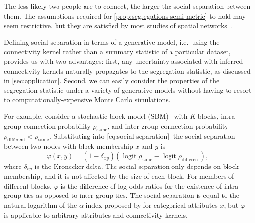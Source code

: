 \documentclass{scrartcl}
\DeclareMathOperator{\logit}{logit}
\begin{document}
\begin{refsection}
The less likely two people are to connect, the larger the social separation between them. The assumptions required for \cref{prop:segregations-semi-metric} to hold may seem restrictive, but they are satisfied by most studies of spatial networks~\cite{Barnett2007,Lambiotte2008,Butts2012,Expert2011}.

Defining social separation in terms of a generative model, i.e.\ using the connectivity kernel rather than a summary statistic of a particular dataset, provides us with two advantages: first, any uncertainty associated with inferred connectivity kernels naturally propagates to the segregation statistic, as discussed in \cref{sec:application}. Second, we can easily consider the properties of the segregation statistic under a variety of generative models without having to resort to computationally-expensive Monte Carlo simulations.

For example, consider a stochastic block model (SBM)~\cite{Snijders2011} with $K$ blocks, intra-group connection probability $\rho_\mathrm{same}$, and inter-group connection probability $\rho_\mathrm{different}<\rho_\mathrm{same}$. Substituting into \cref{eq:social-separation}, the social separation between two nodes with block membership $x$ and $y$ is
\begin{equation}
    \varphi(x, y) = \left(1-\delta_{xy}\right)\left(\logit\rho_\mathrm{same}-\logit\rho_\mathrm{different}\right),\label{eq:social-separation-sbm}
\end{equation}
where $\delta_{xy}$ is the Kronecker delta. The social separation only depends on block membership, and it is not affected by the size of each block. For members of different blocks, $\varphi$ is the difference of log odds ratios for the existence of intra-group ties as opposed to inter-group ties. The social separation is equal to the natural logarithm of the $\alpha$-index proposed by \textcite{Moody2001} for categorical attributes $x$, but $\varphi$ is applicable to arbitrary attributes and connectivity kernels.


\end{refsection}
\end{document}

